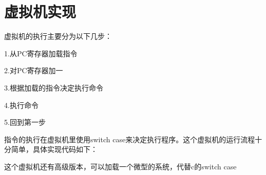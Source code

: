 \section{虚拟机实现}

虚拟机的执行主要分为以下几步：

1.从PC寄存器加载指令

2.对PC寄存器加一

3.根据加载的指令决定执行命令

4.执行命令

5.回到第一步

指令的执行在虚拟机里使用switch case来决定执行程序。这个虚拟机的运行流程十分简单，具体实现代码如下：

% 

% 

% 



这个虚拟机还有高级版本，可以加载一个微型的系统，代替c的switch case

